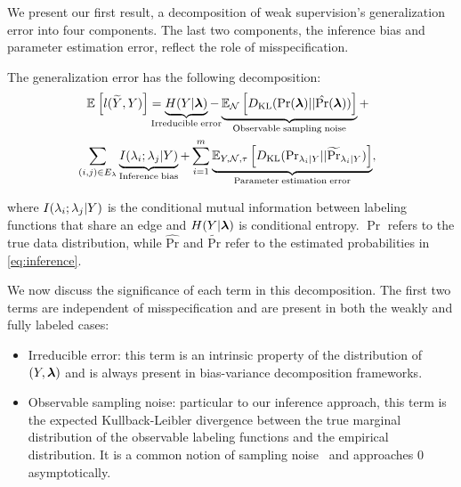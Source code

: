 
We present our first result, a decomposition of weak supervision's generalization error into four components. The last two components, the inference bias and parameter estimation error, reflect the role of misspecification.
\begin{theorem}
The generalization error has the following decomposition:
\begin{align}
    &\E{}{l(\widetilde{Y}, Y)} = \underbrace{H(Y | \bm{\lf})}_{\mathclap{\mathrm{Irreducible \; error}}} - \underbrace{\E{\N}{\KL(\Pr(\bm{\lf}) || \hat{\Pr}(\bm{\lf}))}}_{\mathrm{Observable \; sampling \; noise}} + \nonumber \\ %
    &\sum_{\mathclap{(i, j) \in E_{\lf}}} \;\;\; \underbrace{I(\lf_i; \lf_j | Y)}_{\mathrm{Inference \; bias}} +  \sum_{i = 1}^m \underbrace{\E{Y, \N, \tau}{\KL(\mathrm{Pr}_{\lf_i | Y} || \widetilde{\Pr}_{\lf_i | Y })}}_{\mathrm{Parameter \;estimation \;error}} \nonumber,
\end{align}

where $I(\lambda_i; \lambda_j | Y)$ is the conditional mutual information between labeling functions that share an edge and $H(Y|\bm{\lambda})$ is conditional entropy. $\Pr$ refers to the true data distribution, while $\hat{\mathrm{Pr}}$ and $\widetilde{\mathrm{Pr}}$ refer to the estimated probabilities in \eqref{eq:inference}.

\label{thm:decomposition}
\end{theorem}

We now discuss the significance of each term in this decomposition. The first two terms are independent of misspecification and are present in both the weakly and fully labeled cases:
\begin{itemize}
    \item Irreducible error: this term is an intrinsic property of the distribution of $(Y, \bm{\lambda})$ and is always present in bias-variance decomposition frameworks.
    \item Observable sampling noise: particular to our inference approach, this term is the expected Kullback-Leibler divergence between the true marginal distribution of the observable labeling functions and the empirical distribution. It is a common notion of sampling noise~\cite{domingos2000unified, yang2020rethinking} and approaches $0$ asymptotically.
\end{itemize}

